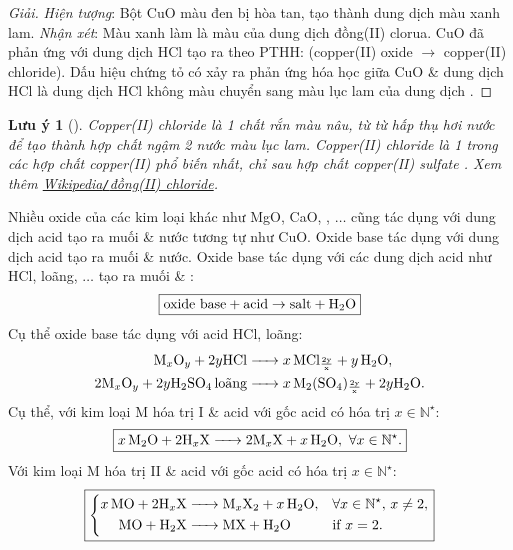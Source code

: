 \documentclass{article}
\newtheorem{luuy}{Lưu ý}
\begin{document}
\begin{proof}[Giải]
	\textit{Hiện tượng}: Bột CuO màu đen bị hòa tan, tạo thành dung dịch màu xanh lam. \textit{Nhận xét}: Màu xanh làm là màu của dung dịch đồng(II) clorua. CuO đã phản ứng với dung dịch HCl tạo ra  theo PTHH:  (copper(II) oxide $\to$ copper(II) chloride). Dấu hiệu chứng tỏ có xảy ra phản ứng hóa học giữa CuO \& dung dịch HCl là dung dịch HCl không màu chuyển sang màu lục lam của dung dịch .
\end{proof}

\begin{luuy}[]
	Copper(II) chloride {\rm{}} là 1 chất rắn màu nâu, từ từ hấp thụ hơi nước để tạo thành hợp chất ngậm 2 nước màu lục lam. Copper(II) chloride là 1 trong các hợp chất copper(II) phổ biến nhất, chỉ sau hợp chất copper(II) sulfate {\rm{}}. Xem thêm \href{https://vi.wikipedia.org/wiki/%C4%90%E1%BB%93ng(II)_chloride}{Wikipedia{\tt/}đồng(II) chloride}.
\end{luuy}
Nhiều oxide của các kim loại khác như MgO, CaO, , $\ldots$ cũng tác dụng với dung dịch acid tạo ra muối \& nước tương tự như CuO. Oxide base tác dụng với dung dịch acid tạo ra muối \& nước. Oxide base tác dụng với các dung dịch acid như HCl,  loãng, $\ldots$ tạo ra muối \& :
\begin{align*}
	\boxed{\mbox{oxide base} + \mbox{acid}\to\mbox{salt} + \ce{H2O}}
\end{align*}
Cụ thể oxide base tác dụng với acid HCl,  loãng:
\begin{align*}
	\ce{M_xO_y + $2y$HCl &-> $x$MCl_{\frac{2y}{x}} + $y$H2O},\\
	\ce{$2$M_xO_y + $2y$H2SO4 \mbox{loãng} &-> $x$M2(SO4)_{\frac{2y}{x}} + $2y$H2O}.
\end{align*}
Cụ thể, với kim loại M hóa trị I \& acid  với gốc acid  có hóa trị $x\in\mathbb{N}^\star$:
\begin{align*}
	\boxed{\ce{$x$M2O + $2$H_xX -> $2$M_xX + $x$H2O},\ \forall x\in\mathbb{N}^\star.}
\end{align*}
Với kim loại M hóa trị II \& acid  với gốc acid  có hóa trị $x\in\mathbb{N}^\star$:
\begin{equation*}
	\boxed{\left\{\begin{split}
			\ce{$x$MO + $2$H_xX &-> M_xX2 + $x$H2O},&&\forall x\in\mathbb{N}^\star,\,x\ne2,\\
			\ce{MO + H2X &-> MX + H2O}&&\mbox{if } x = 2.
		\end{split}\right.}
\end{equation*}
\end{document}
